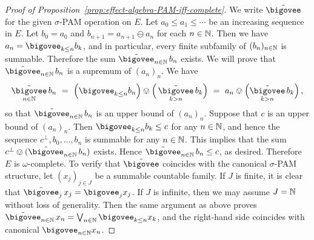 \documentclass[%
	submission,
copyright,creativecommons,UKenglish]{eptcs}
\begin{document}
\begin{proof}[Proof of Proposition~\ref{prop:effect-algebra-PAM-iff-complete}]
\newcommand{\tbigovee}{\mathop{\tilde{\bigovee}}}
We write $\tbigovee$
for the given $\sigma$-PAM operation on $E$.
Let $a_0\leq a_1\leq \dotsb$ be an increasing sequence in $E$.
Let $b_0=a_0$ and
$b_{n+1}= a_{n+1}\ominus a_n$ for each $n\in\mathbb{N}$.
Then we have $a_{n}=\bigovee_{k\le n} b_k$,
and in particular, every finite subfamily
of $(b_{n})_{n\in\mathbb{N}}$ is summable.
Therefore the sum
$\tbigovee_{n\in\N} b_{n}$ exists.
We will prove that $\tbigovee_{n\in\N} b_{n}$
is a supremum of $(a_n)_n$.
We have
\[
\tbigovee_{n\in\N} b_{n}
\ =\ \qty\Big(\bigovee_{k\le n} b_n)\ovee \Big(\tbigovee_{k>n} b_k\Big)
\ =\ a_n\ovee \qty\Big(\tbigovee_{k>n} b_k)
\mpunct,
\]
so that $\tbigovee_{n\in\N} b_{n}$
is an upper bound of $(a_n)_n$.
Suppose that $c$ is an upper bound of $(a_n)_n$.
Then $\bigovee_{k\le n} b_k\le c$
for any $n\in\mathbb{N}$, and hence
the sequence $c^{\bot},b_0,\dotsc,b_n$
is summable for any $n\in \mathbb{N}$.
This implies that the sum
$c^{\bot}\ovee(\tbigovee_{n\in \N} b_n)$ exists.
Hence $\tbigovee_{n\in \N} b_n\le c$,
as desired.
Therefore $E$ is $\omega$-complete.
To verify that $\tbigovee$ coincides with the
canonical $\sigma$-PAM structure,
let $(x_j)_{j\in J}$ be a summable countable family.
If $J$ is finite,
it is clear that
$\tbigovee_j x_j=\bigovee_j x_j$.
If $J$ is infinite,
then we may assume $J=\mathbb{N}$
without loss of generality.
Then the same argument as above
proves
$\tbigovee_{n\in\N} x_{n}=\bigvee_{n\in\N}\bigovee_{k\le n} x_k$,
and the right-hand side coincides with
canonical $\bigovee_{n\in\N} x_n$.
\end{proof}
\end{document}
